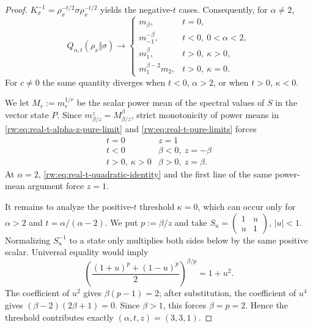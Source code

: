 \documentclass[10pt,a4paper]{amsart}
\begin{document}
\begin{proof}
$K_x^{-1}=\rho_x^{-t/2}\sigma\rho_x^{-t/2}$ yields the negative-$t$
cases.  Consequently, for $\alpha\neq2$,
\begin{equation}
 Q_{\alpha,t}(\rho_x\Vert\sigma)\longrightarrow
 \begin{cases}
  m_\beta,&t=0,\\[1mm]
  m_{-1}^{-\beta},&t<0,\ 0<\alpha<2,\\[1mm]
  m_1^\beta,&t>0,\ \kappa>0,\\[1mm]
  m_1^{\beta-2}m_2,&t>0,\ \kappa=0.
 \end{cases}
 \label{rw:eq:real-t-pure-limits}
\end{equation}
For $c\neq0$ the same quantity diverges when $t<0$, $\alpha>2$,
or when $t>0$, $\kappa<0$.

We let $M_r:=m_r^{1/r}$ be the scalar power mean of the spectral values
of $S$ in the vector state $P$.  Since
$m_{\beta/z}^z=M_{\beta/z}^{\beta}$, strict monotonicity of power
means in \eqref{rw:eq:real-t-alpha-z-pure-limit} and \eqref{rw:eq:real-t-pure-limits}
forces
\begin{equation}
 \begin{array}{c|c}
  t=0&z=1\\
  t<0&\beta<0,\ z=-\beta\\
  t>0,\ \kappa>0&\beta>0,\ z=\beta.
 \end{array}
 \label{rw:eq:real-t-power-mean-candidates}
\end{equation}
At $\alpha=2$, \eqref{rw:eq:real-t-quadratic-identity} and the first
line of the same power-mean argument force $z=1$.

It remains to analyze the positive-$t$ threshold $\kappa=0$, which
can occur only for $\alpha>2$ and
$t=\alpha/(\alpha-2)$.  We put $p:=\beta/z$ and take
$S_u=\left(\begin{smallmatrix}1&u\\u&1\end{smallmatrix}\right)$,
$\lvert u\rvert<1$.  Normalizing $S_u^{-1}$ to a state only
multiplies both sides below by the same positive scalar.  Universal
equality would imply
\begin{equation}
 \left(
  \frac{(1+u)^p+(1-u)^p}{2}
 \right)^{\beta/p}=1+u^2.
 \label{rw:eq:real-t-threshold-identity}
\end{equation}
The coefficient of $u^2$ gives $\beta(p-1)=2$; after substitution,
the coefficient of $u^4$ gives
$(\beta-2)(2\beta+1)=0$.  Since $\beta>1$, this forces
$\beta=p=2$.  Hence the threshold contributes exactly
$(\alpha,t,z)=(3,3,1)$.


\end{proof}
\end{document}

